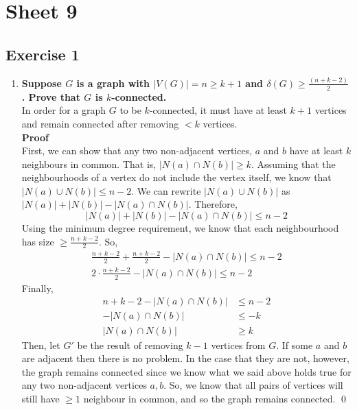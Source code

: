 \section*{Sheet 9}
\subsection*{Exercise 1}
\begin{enumerate}[label=\textbf{(\alph*)}]    \boldmath
    \item \textbf{Suppose $G$ is a graph with $|V(G)| = n \geq k + 1$ and $\delta(G) \geq \frac{(n + k - 2)}{2}$. Prove that $G$ is $k$-connected.}
    \unboldmath \\
    \linebreak 
    In order for a graph $G$ to be $k$-connected, it must have at least $k+1$ vertices and remain connected after removing $<k$ vertices. \\
    \linebreak 
    \textbf{Proof}\\
    First, we can show that any two non-adjacent vertices, $a$ and $b$ have at least $k$ neighbours in common. That is, $|N(a) \cap N(b)| \geq k$. Assuming that the neighbourhoods of a vertex do not include the vertex itself, we know that $|N(a) \cup N(b)| \leq n-2$. We can rewrite $|N(a) \cup N(b)|$ as $|N(a)| + |N(b)| - |N(a) \cap N(b)|$. Therefore, \\
    \begin{equation}
       |N(a)| + |N(b)| - |N(a) \cap N(b)| \leq n-2
    \end{equation}
    Using the minimum degree requirement, we know that each neighbourhood has size $\geq \frac{n+k-2}{2}$. So, 
    \begin{align*}
        \frac{n+k-2}{2} + \frac{n+k-2}{2} - |N(a) \cap N(b)| \leq n-2 
        \\
        2 \cdot \frac{n+k-2}{2} - |N(a) \cap N(b)| \leq n-2
    \end{align*}
    Finally, 
    \begin{align*}
        n + k - 2 - |N(a) \cap N(b)| &\leq n - 2 \\
        -|N(a) \cap N(b)| &\leq - k \\
        |N(a) \cap N(b)| &\geq k
    \end{align*}
    Then, let $G'$ be the result of removing $k-1$ vertices from $G$. If some $a$ and $b$ are adjacent then there is no problem. In the case that they are not, however, the graph remains connected since we know what we said above holds true for any two non-adjacent vertices $a, b$. So, we know that all pairs of vertices will still have $\geq 1$ neighbour in common, and so the graph remains connected. \qed 

\end{enumerate}
